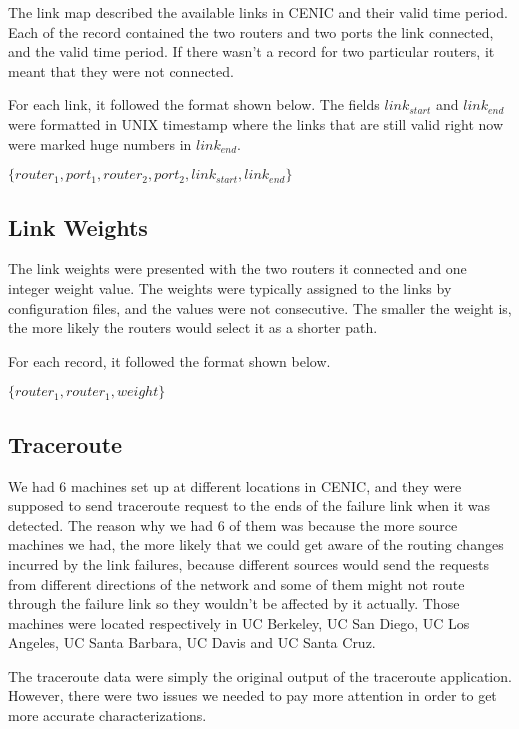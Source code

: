 \documentclass[conference, twocolumn, oneside, 10pt]{IEEEtran}
\begin{document}
The link map described the available links in CENIC and their valid time period. Each of the record contained the two routers and two ports the link connected, and the valid time period. If there wasn't a record for two particular routers, it meant that they were not connected.

For each link, it followed the format shown below. The fields $link_{start}$ and $link_{end}$ were formatted in UNIX timestamp where the links that are still valid right now were marked huge numbers in $link_{end}$.

$\{router_1, port_1, router_2, port_2, link_{start}, link_{end}\}$

\subsection{Link Weights}

The link weights were presented with the two routers it connected and one integer weight value. The weights were typically assigned to the links by configuration files, and the values were not consecutive. The smaller the weight is, the more likely the routers would select it as a shorter path.

For each record, it followed the format shown below.

$\{router_1, router_1, weight\}$

\subsection{Traceroute}

We had 6 machines set up at different locations in CENIC, and they were supposed to send traceroute request to the ends of the failure link when it was detected. The reason why we had 6 of them was because the more source machines we had, the more likely that we could get aware of the routing changes incurred by the link failures, because different sources would send the requests from different directions of the network and some of them might not route through the failure link so they wouldn't be affected by it actually. Those machines were located respectively in UC Berkeley, UC San Diego, UC Los Angeles, UC Santa Barbara, UC Davis and UC Santa Cruz.

The traceroute data were simply the original output of the traceroute application. However, there were two issues we needed to pay more attention in order to get more accurate characterizations.
\end{document}
